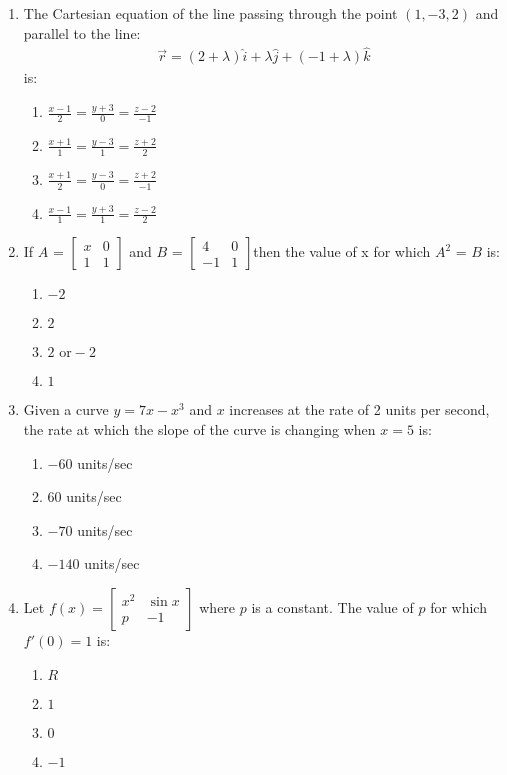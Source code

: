 \documentclass{article}
\providecommand{\myvec}[1]{\ensuremath{\begin{bmatrix}#1\end{bmatrix}}}
\begin{document}
\begin{enumerate}
    \item The Cartesian equation of the line passing through the point $(1, -3, 2)$ and parallel to the line:
   \begin{align}
         \vec{r} = (2 + \lambda)\hat{i} + \lambda \hat{j} + (-1 + \lambda)\hat{k}
   \end{align}
    is:
    \begin{enumerate}[label=(\alph*)]
        \item $\frac{x-1}{2} = \frac{y+3}{0} = \frac{z-2}{-1}$
        \item $\frac{x+1}{1} = \frac{y-3}{1} = \frac{z+2}{2}$
        \item $\frac{x+1}{2} = \frac{y-3}{0} = \frac{z+2}{-1}$
        \item $\frac{x-1}{1} = \frac{y+3}{1} = \frac{z-2}{2}$
    \end{enumerate}
    
    \item If $A$ =  $\myvec{x & 0  \\ 1 & 1 }$ and $B$ = $\myvec{4& 0  \\ -1 & 1 }$then the value of x for which $A^2$ = $B$ is:
    \begin{enumerate}[label=(\alph*)]
        \item $-2$
        \item $2$
        \item $2 \text{ or} -2$
        \item $1$
    \end{enumerate}

    \item Given a curve $y = 7x - x^3$ and $x$ increases at the rate of 2 units per second, the rate at which the slope of the curve is changing when $x = 5$ is:
    \begin{enumerate}[label=(\alph*)]
        \item $-60$ units/sec
        \item $60$ units/sec
        \item $-70$ units/sec
        \item $-140$ units/sec
    \end{enumerate}

    \item Let $f(x) = \myvec{x^2 & \sin x \\ p & -1}$ where $p$ is a constant. The value of $p$ for which $f'(0) = 1$ is:
    \begin{enumerate}[label=(\alph*)]
        \item $R$
        \item $1$
        \item $0$
        \item $-1$
    \end{enumerate}


\end{enumerate}
\end{document}
